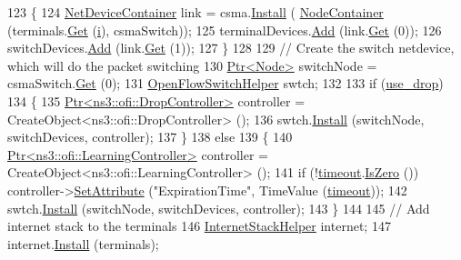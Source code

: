 \begin{DoxyCode}
123     \{
124       \hyperlink{classns3_1_1NetDeviceContainer}{NetDeviceContainer} link = csma.\hyperlink{classns3_1_1CsmaHelper_af79a91372595230b0817200270ab84e7}{Install} (
      \hyperlink{classns3_1_1NodeContainer}{NodeContainer} (terminals.\hyperlink{classns3_1_1NodeContainer_a9ed96e2ecc22e0f5a3d4842eb9bf90bf}{Get} (\hyperlink{bernuolliDistribution_8m_a6f6ccfcf58b31cb6412107d9d5281426}{i}), csmaSwitch));
125       terminalDevices.\hyperlink{classns3_1_1NetDeviceContainer_a7ca8bc1d7ec00fd4fcc63869987fbda5}{Add} (link.\hyperlink{classns3_1_1NetDeviceContainer_a677d62594b5c9d2dea155cc5045f4d0b}{Get} (0));
126       switchDevices.\hyperlink{classns3_1_1NetDeviceContainer_a7ca8bc1d7ec00fd4fcc63869987fbda5}{Add} (link.\hyperlink{classns3_1_1NetDeviceContainer_a677d62594b5c9d2dea155cc5045f4d0b}{Get} (1));
127     \}
128 
129   \textcolor{comment}{// Create the switch netdevice, which will do the packet switching}
130   \hyperlink{classns3_1_1Ptr}{Ptr<Node>} switchNode = csmaSwitch.\hyperlink{classns3_1_1NodeContainer_a9ed96e2ecc22e0f5a3d4842eb9bf90bf}{Get} (0);
131   \hyperlink{classns3_1_1OpenFlowSwitchHelper}{OpenFlowSwitchHelper} swtch;
132 
133   \textcolor{keywordflow}{if} (\hyperlink{openflow-switch_8cc_a95505924ac59ff14d4a2fb6623f86da7}{use\_drop})
134     \{
135       \hyperlink{classns3_1_1Ptr}{Ptr<ns3::ofi::DropController>} controller = 
      CreateObject<ns3::ofi::DropController> ();
136       swtch.\hyperlink{classns3_1_1OpenFlowSwitchHelper_a761e89df7011d691652d85bc5c36e32d}{Install} (switchNode, switchDevices, controller);
137     \}
138   \textcolor{keywordflow}{else}
139     \{
140       \hyperlink{classns3_1_1Ptr}{Ptr<ns3::ofi::LearningController>} controller = 
      CreateObject<ns3::ofi::LearningController> ();
141       \textcolor{keywordflow}{if} (!\hyperlink{openflow-switch_8cc_a386d174ae121d1cfa279074b7e209714}{timeout}.\hyperlink{classns3_1_1Time_ae47420e5c8a04d222b18ee13c2a95799}{IsZero} ()) controller->\hyperlink{classns3_1_1ObjectBase_ac60245d3ea4123bbc9b1d391f1f6592f}{SetAttribute} (\textcolor{stringliteral}{"ExpirationTime"}, 
      TimeValue (\hyperlink{openflow-switch_8cc_a386d174ae121d1cfa279074b7e209714}{timeout}));
142       swtch.\hyperlink{classns3_1_1OpenFlowSwitchHelper_a761e89df7011d691652d85bc5c36e32d}{Install} (switchNode, switchDevices, controller);
143     \}
144 
145   \textcolor{comment}{// Add internet stack to the terminals}
146   \hyperlink{classns3_1_1InternetStackHelper}{InternetStackHelper} internet;
147   internet.\hyperlink{classns3_1_1InternetStackHelper_a6645b412f31283d2d9bc3d8a95cebbc0}{Install} (terminals);

\end{DoxyCode}
